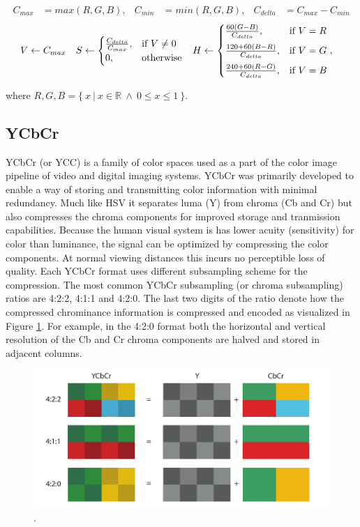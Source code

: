 \documentclass[thesis.tex]{subfiles}
\begin{document}
\begin{align*}
C_{max}&=max(R, G, B),	&	C_{min}&=min(R, G, B),	&	C_{delta}&=C_{max}-C_{min}
\end{align*}
\begin{align*}
V &\leftarrow C_{max}	&
S &\leftarrow
	\begin{cases}
		\frac{C_{delta}}{C_{max}}, & \text{if $V\neq0$}\\
		0, & \text{otherwise}
	\end{cases}			&
H &\leftarrow
	\begin{cases}
		\frac{60(G-B)}{C_{delta}}, & \text{if $V=R$}\vspace{2mm}\\
		\frac{120+60(B-R)}{C_{delta}}, & \text{if $V=G$}\vspace{2mm}\\
		\frac{240+60(R-G)}{C_{delta}}, & \text{if $V=B$}
	\end{cases},
\end{align*}

\noindent where $R, G, B = \{\ x\ \vert\ x \in \mathbb R\ \wedge\ 0 \leq x \leq 1\ \}$.


\subsection{YCbCr}
YCbCr (or YCC) is a family of color spaces used as a part of the color image pipeline of video and digital imaging systems. YCbCr was primarily developed to enable a way of storing and transmitting color information with minimal redundancy. Much like HSV it separates luma (Y) from chroma (Cb and Cr) but also compresses the chroma components for improved storage and tranmission capabilities. Because the human visual system is has lower acuity (sensitivity) for color than luminance, the signal can be optimized by compressing the color components. At normal viewing distances this incurs no perceptible loss of quality. Each YCbCr format uses different subsampling scheme for the compression. The most common YCbCr subsampling (or chroma subsampling) ratios are 4:2:2, 4:1:1 and 4:2:0. The last two digits of the ratio denote how the compressed chrominance information is compressed and encoded as visualized in Figure \ref{figure:ycbcr}. For example, in the 4:2:0 format both the horizontal and vertical resolution of the Cb and Cr chroma components are halved and stored in adjacent columns.

\begin{figure}[ht]
\centering \includegraphics[width=13.25cm]{images/ycbcr}
\caption{ .\label{figure:ycbcr}}
\end{figure}
\end{document}
